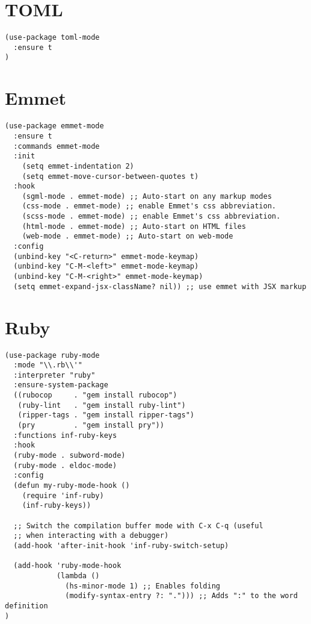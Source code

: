 \documentclass[11pt]{article}
\begin{document}
\section*{TOML}
\label{sec:org8990fd7}
\begin{verbatim}
(use-package toml-mode
  :ensure t
)
\end{verbatim}

\section*{Emmet}
\label{sec:org659daf9}

\begin{verbatim}
(use-package emmet-mode
  :ensure t
  :commands emmet-mode
  :init
    (setq emmet-indentation 2)
    (setq emmet-move-cursor-between-quotes t)
  :hook
    (sgml-mode . emmet-mode) ;; Auto-start on any markup modes
    (css-mode . emmet-mode) ;; enable Emmet's css abbreviation.
    (scss-mode . emmet-mode) ;; enable Emmet's css abbreviation.
    (html-mode . emmet-mode) ;; Auto-start on HTML files
    (web-mode . emmet-mode) ;; Auto-start on web-mode
  :config
  (unbind-key "<C-return>" emmet-mode-keymap)
  (unbind-key "C-M-<left>" emmet-mode-keymap)
  (unbind-key "C-M-<right>" emmet-mode-keymap)
  (setq emmet-expand-jsx-className? nil)) ;; use emmet with JSX markup
\end{verbatim}


\section*{Ruby}
\label{sec:org93c7cdb}

\begin{verbatim}
(use-package ruby-mode
  :mode "\\.rb\\'"
  :interpreter "ruby"
  :ensure-system-package
  ((rubocop     . "gem install rubocop")
   (ruby-lint   . "gem install ruby-lint")
   (ripper-tags . "gem install ripper-tags")
   (pry         . "gem install pry"))
  :functions inf-ruby-keys
  :hook
  (ruby-mode . subword-mode)
  (ruby-mode . eldoc-mode)
  :config
  (defun my-ruby-mode-hook ()
    (require 'inf-ruby)
    (inf-ruby-keys))

  ;; Switch the compilation buffer mode with C-x C-q (useful
  ;; when interacting with a debugger)
  (add-hook 'after-init-hook 'inf-ruby-switch-setup)

  (add-hook 'ruby-mode-hook
            (lambda ()
              (hs-minor-mode 1) ;; Enables folding
              (modify-syntax-entry ?: "."))) ;; Adds ":" to the word definition
)
\end{verbatim}
\end{document}
